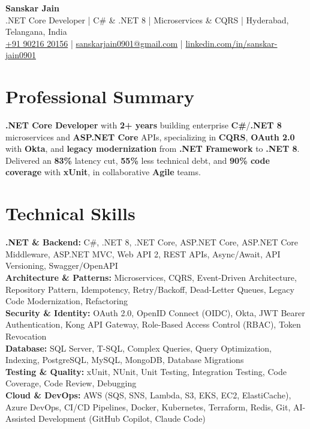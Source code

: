 \documentclass[a4paper,10pt]{article}
\begin{document}
\begin{center}
    {\LARGE \textbf{Sanskar Jain}} \\
    \vspace{2pt}
    .NET Core Developer \;|\; C\# \& .NET 8 \;|\; Microservices \& CQRS \;|\; Hyderabad, Telangana, India \\
    \vspace{2pt}
    \href{tel:+919021620156}{+91 90216 20156} \;|\;
    \href{mailto:sanskarjain0901@gmail.com}{sanskarjain0901@gmail.com} \;|\;
    \href{https://www.linkedin.com/in/sanskar-jain0901/}{linkedin.com/in/sanskar-jain0901}
\end{center}

\section*{Professional Summary}
\textbf{.NET Core Developer} with \textbf{2+ years} building enterprise \textbf{C\#}/\textbf{.NET 8} microservices and \textbf{ASP.NET Core} APIs, specializing in \textbf{CQRS}, \textbf{OAuth 2.0} with \textbf{Okta}, and \textbf{legacy modernization} from \textbf{.NET Framework} to \textbf{.NET 8}.
Delivered an \textbf{83\%} latency cut, \textbf{55\%} less technical debt, and \textbf{90\% code coverage} with \textbf{xUnit}, in collaborative \textbf{Agile} teams.

\section*{Technical Skills}
\begin{sloppypar}
\noindent
\textbf{.NET \& Backend:} C\#, .NET 8, .NET Core, ASP.NET Core, ASP.NET Core Middleware, ASP.NET MVC, Web API 2, REST APIs, Async/Await, API Versioning, Swagger/OpenAPI \\
\textbf{Architecture \& Patterns:} Microservices, CQRS, Event-Driven Architecture, Repository Pattern, Idempotency, Retry/Backoff, Dead-Letter Queues, Legacy Code Modernization, Refactoring \\
\textbf{Security \& Identity:} OAuth 2.0, OpenID Connect (OIDC), Okta, JWT Bearer Authentication, Kong API Gateway, Role-Based Access Control (RBAC), Token Revocation \\
\textbf{Database:} SQL Server, T-SQL, Complex Queries, Query Optimization, Indexing, PostgreSQL, MySQL, MongoDB, Database Migrations \\
\textbf{Testing \& Quality:} xUnit, NUnit, Unit Testing, Integration Testing, Code Coverage, Code Review, Debugging \\
\textbf{Cloud \& DevOps:} AWS (SQS, SNS, Lambda, S3, EKS, EC2, ElastiCache), Azure DevOps, CI/CD Pipelines, Docker, Kubernetes, Terraform, Redis, Git, AI-Assisted Development (GitHub Copilot, Claude Code)
\end{sloppypar}
\end{document}
